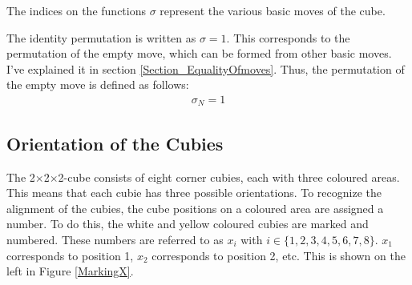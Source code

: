 \documentclass[12pt,a4paper]{article}
\theoremstyle{custom}
\newcommand{\Ttwo}{2$\times$2$\times$2-}
\begin{document}
The indices on the functions $\sigma$ represent the various basic moves of the cube. 

The identity permutation is written as $\sigma=1$. This corresponds to the permutation of the empty move, which can be formed from other basic moves. I've explained it in section \ref{Section_EqualityOfmoves}.
Thus, the permutation of the empty move is defined as follows:
\begin{align*}
\sigma_N = 1
\end{align*}

\subsection{Orientation of the Cubies}
 \label{Section_AlignmentOfcubies}
The \Ttwo cube consists of eight corner cubies, each with three coloured areas. This means that each cubie has three possible orientations.
To recognize the alignment of the cubies, the cube positions on a coloured area are assigned a number. To do this, the white and yellow coloured cubies are marked and numbered. These numbers are referred to as $x_i$ with $i \in \lbrace 1, 2, 3, 4, 5, 6, 7, 8 \rbrace$. $x_1$ corresponds to position 1, $x_2$ corresponds to position 2, etc. This is shown on the left in Figure \ref{MarkingX}.
\end{document}
